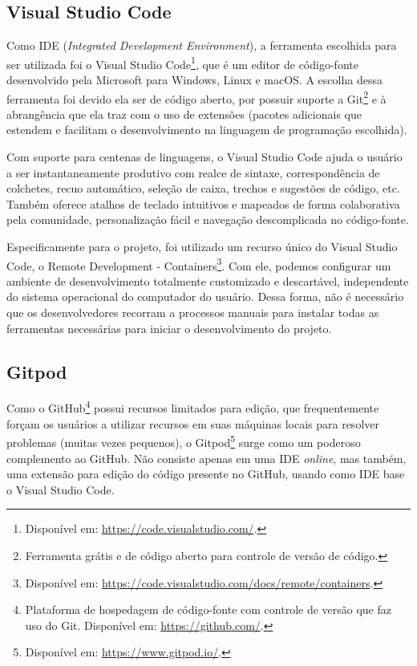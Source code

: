 \subsection{Visual Studio Code}
\label{ssec:VSCode}
Como IDE (\textit{Integrated Development Environment}), a ferramenta escolhida para ser utilizada foi o Visual Studio Code\footnote{Disponível em: \url{https://code.visualstudio.com/}.}, que é um editor de código-fonte desenvolvido pela Microsoft para Windows, Linux e macOS. A escolha dessa ferramenta foi devido ela ser de código aberto, por possuir suporte a Git\footnote{Ferramenta grátis e de código aberto para controle de versão de código.} e à abrangência que ela traz com o uso de extensões (pacotes adicionais que estendem e facilitam o desenvolvimento na linguagem de programação escolhida).

Com suporte para centenas de linguagens, o Visual Studio Code ajuda o usuário a ser instantaneamente produtivo com realce de sintaxe, correspondência de colchetes, recuo automático, seleção de caixa, trechos e sugestões de código, etc. Também oferece atalhos de teclado intuitivos e mapeados de forma colaborativa pela comunidade, personalização fácil e navegação descomplicada no código-fonte. \cite{microsoft2020VSCode}

Especificamente para o projeto, foi utilizado um recurso único do Visual Studio Code, o Remote Development - Containers\footnote{Disponível em: \url{https://code.visualstudio.com/docs/remote/containers}.}. Com ele, podemos configurar um ambiente de desenvolvimento totalmente customizado e descartável, independente do sistema operacional do computador do usuário. Dessa forma, não é necessário que os desenvolvedores recorram a processos manuais para instalar todas as ferramentas necessárias para iniciar o desenvolvimento do projeto.

\subsection{Gitpod}
\label{ssec:Gitpod}
Como o GitHub\footnote{Plataforma de hospedagem de código-fonte com controle de versão que faz uso do Git. Disponível em: \url{https://github.com/}.} possui recursos limitados para edição, que frequentemente forçam os usuários a utilizar recursos em suas máquinas locais para resolver problemas (muitas vezes pequenos), o Gitpod\footnote{Disponível em: \url{https://www.gitpod.io/}.} surge como um poderoso complemento ao GitHub. Não consiste apenas em uma IDE \textit{online}, mas também, uma extensão para edição do código presente no GitHub, usando como IDE base o Visual Studio Code.

